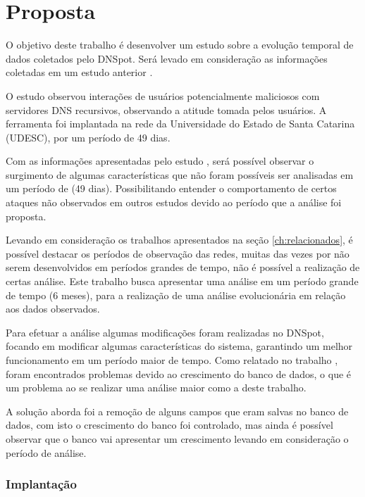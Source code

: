 \chapter{Proposta}
\label{ch:proposta}

O objetivo deste trabalho é desenvolver um estudo sobre a evolução temporal de dados coletados pelo DNSpot. Será levado em consideração as informações coletadas em um estudo anterior \cite{Longo:2015:tcc}.%

O estudo observou interações de usuários potencialmente maliciosos com servidores DNS recursivos, observando a atitude tomada pelos usuários. A ferramenta foi implantada na rede da Universidade do Estado de Santa Catarina (UDESC), por um período de 49 dias.

Com as informações apresentadas pelo estudo \cite{Longo:2015:tcc}, será possível observar o surgimento de algumas características que não foram possíveis ser analisadas em um período de (49 dias). Possibilitando entender o comportamento de certos ataques não observados em outros estudos devido ao período que a análise foi proposta.

Levando em consideração os trabalhos apresentados na seção \ref{ch:relacionados}, é possível destacar os períodos de observação das redes, muitas das vezes por não serem desenvolvidos em períodos grandes de tempo, não é possível a realização de certas análise. Este trabalho busca apresentar uma análise em um período grande de tempo (6 meses), para a realização de uma análise evolucionária em relação aos dados observados.

Para efetuar a análise algumas modificações foram realizadas no DNSpot, focando em modificar algumas características do sistema, garantindo um melhor funcionamento em um período maior de tempo. Como relatado no trabalho  \cite{Longo:2015:tcc}, foram encontrados problemas devido ao crescimento do banco de dados, o que é um problema ao se realizar uma análise maior como a deste trabalho. 

A solução aborda foi a remoção de alguns campos que eram salvas no banco de dados, com isto o crescimento do banco foi controlado, mas ainda é possível observar que o banco vai apresentar um crescimento levando em consideração o período de análise. %

\subsection{Implantação}

